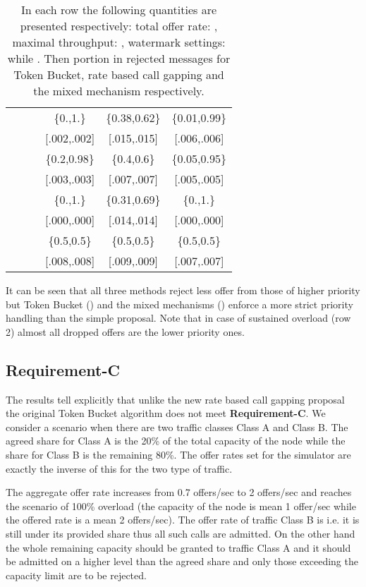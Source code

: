 \documentclass[conference]{IEEEtran}
\newcommand{\reqC}{\textbf{Requirement-C}}
\begin{document}
\begin{table}\label{table:reqB}
\center
\begin{tabular}{|c|c|c||c|c|c|}
\hline
 &  &  & \{0.,1.\} & \{0.38,0.62\} & \{0.01,0.99\} \\
 &  &  & [.002,.002] & [.015,.015] & [.006,.006] \\
\hline
 &  &  & \{0.2,0.98\} & \{0.4,0.6\} & \{0.05,0.95\}\\
 &  &  &  [.003,.003] & [.007,.007] & [.005,.005] \\
\hline
 &  &  & \{0.,1.\} & \{0.31,0.69\} & \{0.,1.\}\\
 &  &  & [.000,.000] & [.014,.014] & [.000,.000] \\
\hline
 &  &  & \{0.5,0.5\} & \{0.5,0.5\} & \{0.5,0.5\}\\
 &  &  & [.008,.008] & [.009,.009] & [.007,.007] \\
\hline
\end{tabular}
\caption{In each row the following quantities are presented
respectively: total offer rate: , maximal throughput: ,
watermark settings:  while
. Then portion in rejected messages for Token Bucket,
rate based call gapping and the mixed mechanism respectively.}
\end{table}

It can be seen that all three methods reject less offer from those
of higher priority but Token Bucket () and the mixed
mechanisms () enforce a more strict priority handling than
the simple proposal. Note that in case of sustained overload (row 2)
almost all dropped offers are the lower priority ones.

\subsection{\reqC}
The results tell explicitly that unlike the new rate based call
gapping proposal the original Token Bucket algorithm does not meet
\reqC. We consider a scenario when there are two traffic classes
Class A and Class B. The agreed share for Class A is the 20\% of the
total capacity of the node while the share for Class B is the
remaining 80\%. The offer rates set for the simulator are exactly
the inverse of this for the two type of traffic.

The aggregate offer rate increases from 0.7 offers/sec to 2
offers/sec and reaches the scenario of 100\% overload (the capacity
of the node is mean 1 offer/sec while the offered rate is a mean 2
offers/sec). The offer rate of traffic Class B is  i.e. it is
still under its provided share thus all such calls are admitted. On
the other hand the whole remaining capacity should be granted to
traffic Class A and it should be admitted on a higher level than the
agreed share and only those exceeding the capacity limit are to be
rejected.
\end{document}
